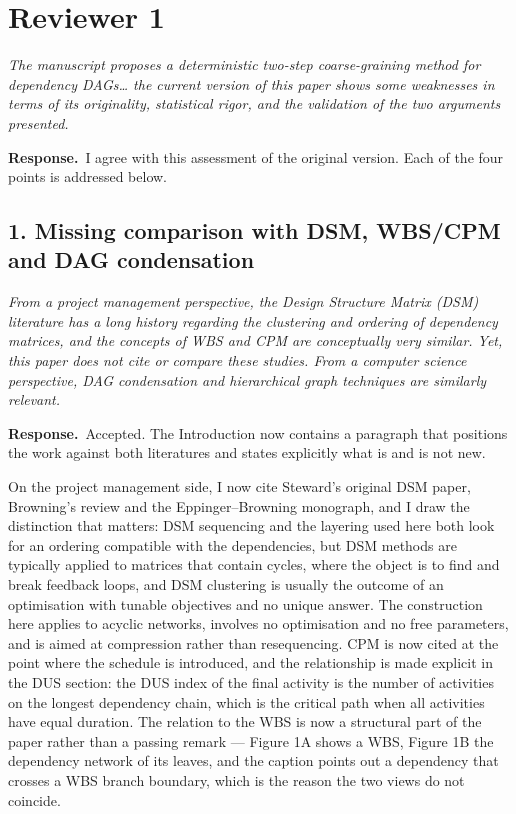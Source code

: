 \documentclass[11pt,a4paper]{article}
\newcommand{\rev}[1]{\medskip\noindent\textit{#1}\par\medskip}
\newcommand{\reply}{\noindent\textbf{Response.}\ }
\begin{document}
\section*{Reviewer 1}

\rev{The manuscript proposes a deterministic two-step coarse-graining method for
dependency DAGs\ldots{} the current version of this paper shows some weaknesses in
terms of its originality, statistical rigor, and the validation of the two
arguments presented.}

\reply I agree with this assessment of the original version. Each of the four
points is addressed below.

\subsection*{1. Missing comparison with DSM, WBS/CPM and DAG condensation}

\rev{From a project management perspective, the Design Structure Matrix (DSM)
literature has a long history regarding the clustering and ordering of dependency
matrices, and the concepts of WBS and CPM are conceptually very similar. Yet,
this paper does not cite or compare these studies. From a computer science
perspective, DAG condensation and hierarchical graph techniques are similarly
relevant.}

\reply Accepted. The Introduction now contains a paragraph that positions the
work against both literatures and states explicitly what is and is not new.

On the project management side, I now cite Steward's original DSM paper,
Browning's review and the Eppinger--Browning monograph, and I draw the
distinction that matters: DSM sequencing and the layering used here both look
for an ordering compatible with the dependencies, but DSM methods are typically
applied to matrices that contain cycles, where the object is to find and break
feedback loops, and DSM clustering is usually the outcome of an optimisation
with tunable objectives and no unique answer. The construction here applies to
acyclic networks, involves no optimisation and no free parameters, and is aimed
at compression rather than resequencing. CPM is now cited at the point where the
schedule is introduced, and the relationship is made explicit in the DUS section:
the DUS index of the final activity is the number of activities on the longest
dependency chain, which is the critical path when all activities have equal
duration. The relation to the WBS is now a structural part of the paper rather
than a passing remark --- Figure 1A shows a WBS, Figure 1B the dependency network
of its leaves, and the caption points out a dependency that crosses a WBS branch
boundary, which is the reason the two views do not coincide.
\end{document}

